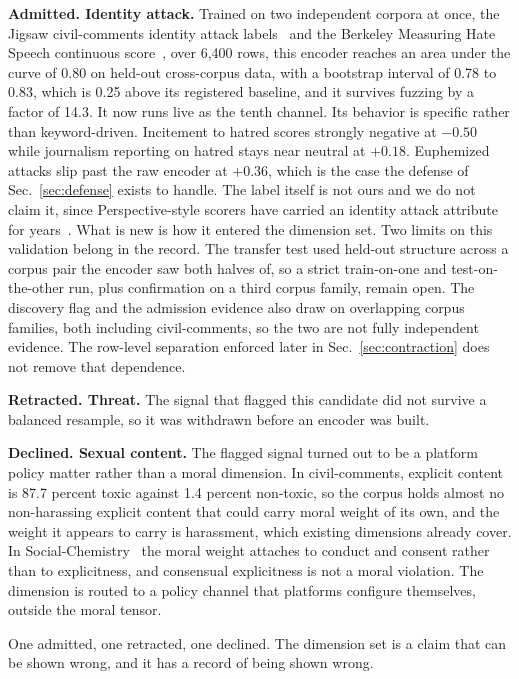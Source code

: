 \documentclass[journal]{IEEEtran}
\begin{document}
\textbf{Admitted. Identity attack.} Trained on two independent corpora at
once, the Jigsaw civil-comments identity attack
labels~\cite{borkan2019nuanced} and the Berkeley Measuring Hate Speech
continuous score~\cite{kennedy2020constructing}, over 6,400 rows, this
encoder reaches an area under the curve of 0.80 on held-out cross-corpus
data, with a bootstrap interval of 0.78 to 0.83, which is 0.25 above its
registered baseline, and it survives fuzzing by a factor of 14.3. It now runs
live as the tenth channel. Its behavior is specific rather than
keyword-driven. Incitement to hatred scores strongly negative at $-0.50$
while journalism reporting on hatred stays near neutral at $+0.18$.
Euphemized attacks slip past the raw encoder at $+0.36$, which is the case
the defense of Sec.~\ref{sec:defense} exists to handle. The label itself is
not ours and we do not claim it, since Perspective-style scorers have carried
an identity attack attribute for years~\cite{borkan2019nuanced}. What is new
is how it entered the dimension set. Two limits on this validation belong in
the record. The transfer test used held-out structure across a corpus pair
the encoder saw both halves of, so a strict train-on-one and test-on-the-other
run, plus confirmation on a third corpus family, remain open. The discovery
flag and the admission evidence also draw on overlapping corpus families,
both including civil-comments, so the two are not fully independent evidence.
The row-level separation enforced later in Sec.~\ref{sec:contraction} does
not remove that dependence.

\textbf{Retracted. Threat.} The signal that flagged this candidate did not
survive a balanced resample, so it was withdrawn before an encoder was built.

\textbf{Declined. Sexual content.} The flagged signal turned out to be a
platform policy matter rather than a moral dimension. In civil-comments,
explicit content is 87.7 percent toxic against 1.4 percent non-toxic, so the
corpus holds almost no non-harassing explicit content that could carry moral
weight of its own, and the weight it appears to carry is harassment, which
existing dimensions already cover. In
Social-Chemistry~\cite{forbes2020social} the moral weight attaches to conduct
and consent rather than to explicitness, and consensual explicitness is not a
moral violation. The dimension is routed to a policy channel that platforms
configure themselves, outside the moral tensor.

One admitted, one retracted, one declined. The dimension set is a claim that
can be shown wrong, and it has a record of being shown wrong.
\end{document}
